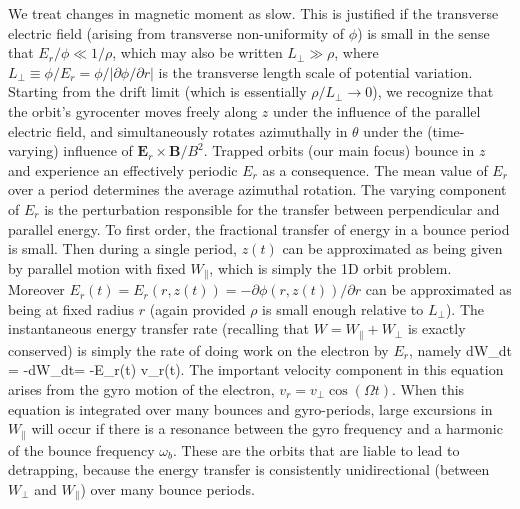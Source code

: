 \documentclass{agujournal2019}
\let\oldequation\equation
\let\oldendequation\endequation
\renewenvironment{equation}
  {\linenomathNonumbers\oldequation}
  {\oldendequation\endlinenomath}
\begin{document}
We treat changes in magnetic moment as slow. This is justified if
the transverse electric field (arising from transverse non-uniformity
of $\phi$) is small in the sense that $E_r/\phi\ll 1/\rho$, which may
also be written $L_\perp\gg \rho$, where
$L_\perp \equiv \phi/E_r=\phi/|\partial \phi/\partial r|$ is the
transverse length scale of potential variation. Starting from the
drift limit (which is essentially $\rho/L_\perp\to 0$), we recognize
that the orbit's gyrocenter moves freely along $z$ under the influence
of the parallel electric field, and simultaneously rotates azimuthally
in $\theta$ under the (time-varying) influence of
$\bm{E}_r\times \bm{B}/B^2$.  Trapped orbits (our main focus) bounce
in $z$ and experience an effectively periodic $E_r$ as a
consequence. The mean value of $E_r$ over a period determines the
average azimuthal rotation. The varying component of $E_r$ is the
perturbation responsible for the transfer between perpendicular and
parallel energy. To first order, the fractional transfer of energy in
a bounce period is small. Then during a single period, $z(t)$ can be
approximated as being given by parallel motion with fixed
$W_\parallel$, which is simply the 1D orbit problem. Moreover
$E_r(t)=E_r(r,z(t))=-\partial \phi(r,z(t))/\partial r$ can be
approximated as being at fixed radius $r$ (again provided $\rho$ is
small enough relative to $L_\perp$). The instantaneous energy transfer
rate (recalling that $W=W_\parallel+W_\perp$ is exactly conserved) is
simply the rate of doing work on the electron by $E_r$, namely
\begin{equation}
  \label{eq:workrate}
  {dW_\parallel\over dt} = -{dW_\perp\over dt}= -E_r(t) v_r(t).
\end{equation}
The important velocity component in this equation arises from the gyro
motion of the electron, $v_r=v_\perp \cos(\Omega t)$. When this
equation is integrated over many bounces and gyro-periods, large
excursions in $W_\parallel$ will occur if there is a resonance
between the gyro frequency and a harmonic of the bounce frequency
$\omega_b$. These are the orbits that are liable to lead to
detrapping, because the energy transfer is consistently unidirectional
(between $W_\perp$ and $W_\parallel$) over many bounce periods.
\end{document}
